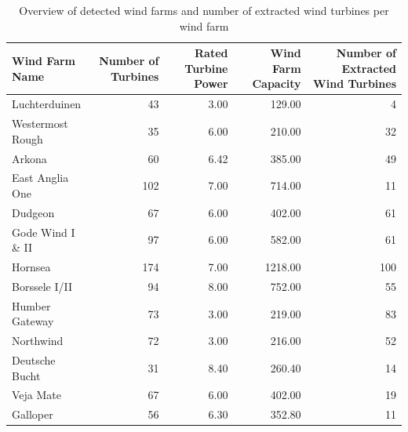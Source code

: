 \documentclass[wes, manuscript]{copernicus}
\begin{document}
\begin{table}
    \caption[]{Overview of detected wind farms and number of extracted wind turbines per wind farm}
    \centering
    \begin{tabular}{lrrrr}
    \toprule
     Wind Farm Name &  Number of Turbines &  Rated Turbine Power &  Wind Farm Capacity &  Number of Extracted Wind Turbines \\
    \midrule
      Luchterduinen &                  43 &                 3.00 &              129.00 &                                  4 \\
   Westermost Rough &                  35 &                 6.00 &              210.00 &                                 32 \\
             Arkona &                  60 &                 6.42 &              385.00 &                                 49 \\
    East Anglia One &                 102 &                 7.00 &              714.00 &                                 11 \\
            Dudgeon &                  67 &                 6.00 &              402.00 &                                 61 \\
   Gode Wind I \& II &                  97 &                 6.00 &              582.00 &                                 61 \\
            Hornsea &                 174 &                 7.00 &             1218.00 &                                100 \\
      Borssele I/II &                  94 &                 8.00 &              752.00 &                                 55 \\
     Humber Gateway &                  73 &                 3.00 &              219.00 &                                 83 \\
          Northwind &                  72 &                 3.00 &              216.00 &                                 52 \\
     Deutsche Bucht &                  31 &                 8.40 &              260.40 &                                 14 \\
          Veja Mate &                  67 &                 6.00 &              402.00 &                                 19 \\
           Galloper &                  56 &                 6.30 &              352.80 &                                 11 \\

\end{tabular}
\end{table}
\end{document}
